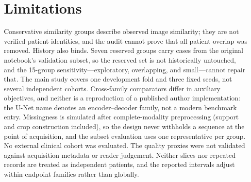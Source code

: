 \section{Limitations}
\label{sec:limits} Conservative similarity groups describe observed image similarity; they are not verified patient identities, and the audit cannot prove that all patient overlap was removed. History also binds. Seven reserved groups carry cases from the original notebook's validation subset, so the reserved set is not historically untouched, and the 15-group sensitivity---exploratory, overlapping, and small---cannot repair that. The main study covers one development fold and three fixed seeds, not several independent cohorts. Cross-family comparators differ in auxiliary objectives, and neither is a reproduction of a published author implementation: the U-Net name denotes an encoder--decoder family, not a modern benchmark entry. Missingness is simulated after complete-modality preprocessing (support and crop construction included), so the design never withholds a sequence at the point of acquisition, and the subset evaluation uses one representative per group. No external clinical cohort was evaluated. The quality proxies were not validated against acquisition metadata or reader judgement. Neither slices nor repeated records are treated as independent patients, and the reported intervals adjust within endpoint families rather than globally.

